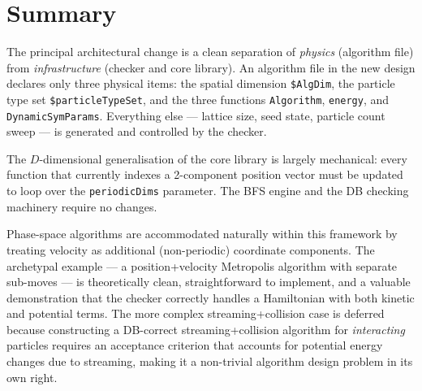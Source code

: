 \documentclass[12pt,a4paper]{article}
\begin{document}
\section{Summary}

The principal architectural change is a clean separation of \emph{physics}
(algorithm file) from \emph{infrastructure} (checker and core library).  An
algorithm file in the new design declares only three physical items: the spatial
dimension \texttt{\$AlgDim}, the particle type set \texttt{\$particleTypeSet},
and the three functions \texttt{Algorithm}, \texttt{energy}, and
\texttt{DynamicSymParams}.  Everything else --- lattice size, seed state,
particle count sweep --- is generated and controlled by the checker.

The $D$-dimensional generalisation of the core library is largely mechanical:
every function that currently indexes a 2-component position vector must be
updated to loop over the \texttt{periodicDims} parameter.  The BFS engine and
the DB checking machinery require no changes.

Phase-space algorithms are accommodated naturally within this framework by
treating velocity as additional (non-periodic) coordinate components.  The
archetypal example --- a position+velocity Metropolis algorithm with separate
sub-moves --- is theoretically clean, straightforward to implement, and a
valuable demonstration that the checker correctly handles a Hamiltonian with
both kinetic and potential terms.  The more complex streaming+collision case is
deferred because constructing a DB-correct streaming+collision algorithm for
\emph{interacting} particles requires an acceptance criterion that accounts for
potential energy changes due to streaming, making it a non-trivial algorithm
design problem in its own right.
\end{document}
